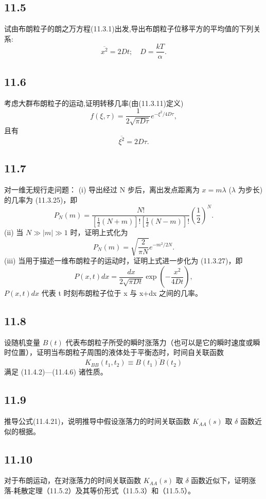 \newpage
\subsection{11.5}
试由布朗粒子的朗之万方程(11.3.1)出发,导出布朗粒子位移平方的平均值的下列关系:
$$\overline{x^2} = 2Dt; \quad D = \frac{kT}{\alpha}.$$

\newpage
\subsection{11.6}
考虑大群布朗粒子的运动,证明转移几率(由(11.3.11)定义)
$$f(\xi, \tau) = \frac{1}{2\sqrt{\pi D\tau}} e^{-\xi^2 / 4D\tau},$$
且有
$$\overline{\xi^2} = 2D\tau.$$

\newpage
\subsection{11.7}
对一维无规行走问题：
(i) 导出经过 N 步后，离出发点距离为 $x = m\lambda$ ($\lambda$ 为步长)的几率为 (11.3.25)，即
$$P_N(m) = \frac{N!}{\left[ \frac{1}{2}(N+m) \right]! \left[ \frac{1}{2}(N-m) \right]!} \left( \frac{1}{2} \right)^N.$$
(ii) 当 $N\gg|m|\gg1$ 时，证明上式化为
$$P_N(m) = \sqrt{\frac{2}{\pi N}} e^{-m^2/2N}.$$
(iii) 当用于描述一维布朗粒子的运动时，证明上式进一步化为 (11.3.27)，即
$$P(x,t)dx = \frac{dx}{2\sqrt{\pi Dt}} \exp \left( -\frac{x^2}{4Dt} \right),$$
$P(x,t)dx$ 代表 t 时刻布朗粒子位于 x 与 x+dx 之间的几率。

\newpage
\subsection{11.8}
设随机变量 $B(t)$ 代表布朗粒子所受的瞬时涨落力（也可以是它的瞬时速度或瞬时位置），证明当布朗粒子周围的液体处于平衡态时，时间自关联函数
$$K_{BB}(t_1,t_2) \equiv \overline{B(t_1)B(t_2)}$$
满足 (11.4.2)—(11.4.6) 诸性质。

\newpage
\subsection{11.9}
推导公式(11.4.21)，说明推导中假设涨落力的时间关联函数 $K_{AA}(s)$ 取 $\delta$ 函数近似的根据。

\newpage
\subsection{11.10}
对于布朗运动，在对涨落力的时间关联函数 $K_{AA}(s)$ 取 $\delta$ 函数近似下，证明涨落-耗散定理（11.5.2）及其等价形式（11.5.3）和（11.5.5）。

